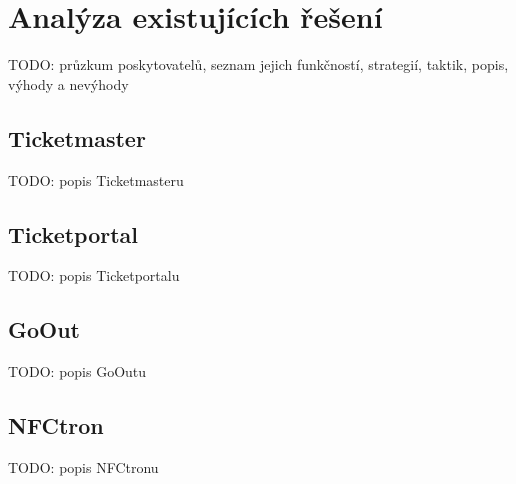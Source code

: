 \chapter{Analýza existujících řešení}
\label{ch:analyza-trhu}
TODO: průzkum poskytovatelů, seznam jejich funkčností, strategií, taktik, popis, výhody a nevýhody

\section{Ticketmaster}
\label{sec:analyza-trhu-ticketmaster}
TODO: popis Ticketmasteru

\section{Ticketportal}
\label{sec:analyza-trhu-ticketportal}
TODO: popis Ticketportalu

\section{GoOut}
\label{sec:analyza-trhu-goout}
TODO: popis GoOutu

\section{NFCtron}
\label{sec:analyza-trhu-nfctron}
TODO: popis NFCtronu
